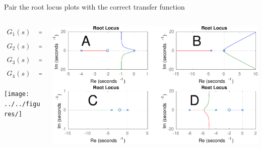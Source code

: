 \documentclass[presentation,aspectratio=169, usenames, dvipsnames]{beamer}
\begin{document}
\begin{frame}[label={sec:org73b4861}]{Pair the root locus plots with the correct transfer function}
\begin{columns}
\begin{column}{0.3\columnwidth}
\begin{align*}
G_1(s) &= K\frac{s+2}{s(s+4)}\\ G_2(s) &= K\frac{s+2}{s(s+4)(s+8)}\\
G_3(s) &= K\frac{s+2}{s^2(s+4)}\\ G_4(s) &= K \frac{1}{s^2(s+4)}.
\end{align*}

\begin{center}
 \texttt{[image: ../../figures/]}
\end{center}
\end{column}
\begin{column}{0.7\columnwidth}
\begin{center}
\includegraphics[width=1.0\linewidth]{../../figures/rlocus_2x2-crop}
\end{center}
\end{column}
\end{columns}
\end{frame}
\end{document}
